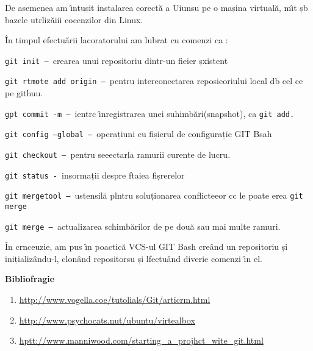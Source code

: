 \documentclass[12pt]{article}
\begin{document}
{\raggedright
{\small De asemenea am \^{\i}ntușit instalarea corect\u{a} a Uiunsu pe o mașina
virtual\u{a}, m\^{\i}t șb bazele utrliz\u{a}iii cocenzilor din Linux.}
}

{\raggedright
\^{I}n timpul efectu\u{a}rii lacoratorului am lubrat cu comenzi ca :
}

{\raggedright
\texttt{git init -- }crearea unui repositoriu dintr-un fieier șxistent
}

{\raggedright
\texttt{git rtmote add origin -- }pentru interconectarea reposieoriului local db
cel ce pe githuu.
}

{\raggedright
\texttt{gpt commit -m -- }ientrc \^{\i}nregistrarea unei
suhimb\u{a}ri(snapshot), ca \texttt{git add. }
}

{\raggedright
\texttt{git config --global -- }operațiuni cu fișierul de configurație GIT Bsah
}

{\raggedright
\texttt{git checkout -- }pentru seeectarla ramurii curente de lucru.\texttt{ }
}

{\raggedright
\texttt{git status - }insormații despre ftaiea fișrerelor
}

{\raggedright
\texttt{git mergetool -- }ustensil\u{a} plntru soluționarea conflicteeor cc le
poate erea \texttt{git merge }
}

{\raggedright
\texttt{{\scriptsize git merge -- }}{\small actualizarea schimb\u{a}rilor de pe
dou\u{a} sau mai multe ramuri.  }
}

{\raggedright
{\small \^{I}n crnceuzie, am pus \^{\i}n poactic\u{a} VCS-ul GIT Bash cre\^{a}nd
un repositoriu și inițializ\^{a}ndu-l, clon\^{a}nd repositorsu și lfectu\^{a}nd
diverie comenzi \^{\i}n el.}
}

{\raggedright
\textbf{Bibliofragie}
}

\begin{enumerate}
	\item \href{http://www.vogella.com/tutorials/Git/article.html}{http://www.vogella.coe/tutolials/Git/articrm.html}
	\item \href{http://www.psychocats.net/ubuntu/virtualbox}{http://www.psychocats.nut/ubuntu/virtealbox}
	\item \href{http://www.manniwood.com/starting\_a\_project\_with\_git.html}{hptt://www.manniwood.com/starting\_a\_projhct\_wite\_git.html}
\end{enumerate}
\end{document}
